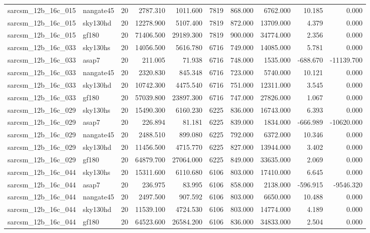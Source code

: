 \documentclass{article}
\begin{document}
\begin{longtable}{llrrrrrrrr}
sarcsm\_12b\_16c\_015 & nangate45 & 20 & 2787.310 & 1011.600 & 7819 & 868.000 & 6762.000 & 10.185 & 0.000 \\
sarcsm\_12b\_16c\_015 & sky130hd & 20 & 12278.900 & 5107.400 & 7819 & 872.000 & 13709.000 & 4.379 & 0.000 \\
sarcsm\_12b\_16c\_015 & gf180 & 20 & 71406.500 & 29189.300 & 7819 & 900.000 & 34774.000 & 2.356 & 0.000 \\
sarcsm\_12b\_16c\_033 & sky130hs & 20 & 14056.500 & 5616.780 & 6716 & 749.000 & 14085.000 & 5.781 & 0.000 \\
sarcsm\_12b\_16c\_033 & asap7 & 20 & 211.005 & 71.938 & 6716 & 748.000 & 1535.000 & -688.670 & -11139.700 \\
sarcsm\_12b\_16c\_033 & nangate45 & 20 & 2320.830 & 845.348 & 6716 & 723.000 & 5740.000 & 10.121 & 0.000 \\
sarcsm\_12b\_16c\_033 & sky130hd & 20 & 10742.300 & 4475.540 & 6716 & 751.000 & 12311.000 & 3.545 & 0.000 \\
sarcsm\_12b\_16c\_033 & gf180 & 20 & 57039.800 & 23897.300 & 6716 & 747.000 & 27826.000 & 1.067 & 0.000 \\
sarcsm\_12b\_16c\_029 & sky130hs & 20 & 15490.300 & 6160.230 & 6225 & 836.000 & 16743.000 & 6.393 & 0.000 \\
sarcsm\_12b\_16c\_029 & asap7 & 20 & 226.894 & 81.181 & 6225 & 839.000 & 1834.000 & -666.989 & -10620.000 \\
sarcsm\_12b\_16c\_029 & nangate45 & 20 & 2488.510 & 899.080 & 6225 & 792.000 & 6372.000 & 10.346 & 0.000 \\
sarcsm\_12b\_16c\_029 & sky130hd & 20 & 11456.500 & 4715.770 & 6225 & 827.000 & 13944.000 & 3.402 & 0.000 \\
sarcsm\_12b\_16c\_029 & gf180 & 20 & 64879.700 & 27064.000 & 6225 & 849.000 & 33635.000 & 2.069 & 0.000 \\
sarcsm\_12b\_16c\_044 & sky130hs & 20 & 15311.600 & 6110.680 & 6106 & 803.000 & 17410.000 & 6.645 & 0.000 \\
sarcsm\_12b\_16c\_044 & asap7 & 20 & 236.975 & 83.995 & 6106 & 858.000 & 2138.000 & -596.915 & -9546.320 \\
sarcsm\_12b\_16c\_044 & nangate45 & 20 & 2497.500 & 907.592 & 6106 & 803.000 & 6650.000 & 10.488 & 0.000 \\
sarcsm\_12b\_16c\_044 & sky130hd & 20 & 11539.100 & 4724.530 & 6106 & 803.000 & 14774.000 & 4.189 & 0.000 \\
sarcsm\_12b\_16c\_044 & gf180 & 20 & 64523.600 & 26584.200 & 6106 & 836.000 & 34833.000 & 2.504 & 0.000 \\

\end{longtable}
\end{document}
